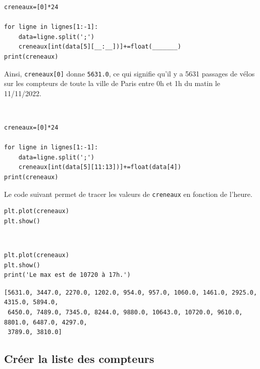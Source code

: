 \begin{verbatim}
creneaux=[0]*24

for ligne in lignes[1:-1]:
    data=ligne.split(';')
    creneaux[int(data[5][__:__])]+=float(_______)
print(creneaux)
\end{verbatim}

Ainsi, \verb?creneaux[0]? donne \verb?5631.0?, ce qui signifie qu'il y a 5631 passages de vélos sur les compteurs de toute la ville de Paris entre 0h et 1h du matin le 11/11/2022.

\begin{solution}~\ \\
\begin{verbatim}
creneaux=[0]*24

for ligne in lignes[1:-1]:
    data=ligne.split(';')
    creneaux[int(data[5][11:13])]+=float(data[4])
print(creneaux)
\end{verbatim}
\end{solution}

Le code suivant permet de tracer les valeurs de \verb?creneaux? en fonction de l'heure.
\begin{verbatim}
plt.plot(creneaux)
plt.show()
\end{verbatim}



\begin{solution}~\ \\
\begin{verbatim}
plt.plot(creneaux)
plt.show()
print('Le max est de 10720 à 17h.')
\end{verbatim}

\verb?[5631.0, 3447.0, 2270.0, 1202.0, 954.0, 957.0, 1060.0, 1461.0, 2925.0, 4315.0, 5894.0, ?\\ \verb? 6450.0, 7489.0, 7345.0, 8244.0, 9880.0, 10643.0, 10720.0, 9610.0, 8801.0, 6487.0, 4297.0,?\\ \verb? 3789.0, 3810.0]?
\begin{center}
\resizebox{0.5\textwidth}{!}{}
\end{center}
\end{solution}

\newpage

\subsection{Créer la liste des compteurs}

